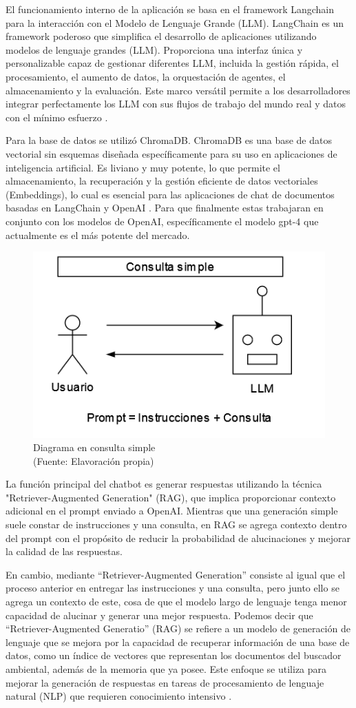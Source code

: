 El funcionamiento interno de la aplicación se basa en el framework Langchain para la interacción con el Modelo de Lenguaje Grande (LLM). 
LangChain es un framework poderoso que simplifica el desarrollo de aplicaciones utilizando modelos de lenguaje grandes (LLM). Proporciona 
una interfaz única y personalizable capaz de gestionar diferentes LLM, incluida la gestión rápida, el procesamiento, el aumento de datos, 
la orquestación de agentes, el almacenamiento y la evaluación. Este marco versátil permite a los desarrolladores integrar perfectamente 
los LLM con sus flujos de trabajo del mundo real y datos con el mínimo esfuerzo \cite{langchain1}.

Para la base de datos se utilizó ChromaDB. ChromaDB es una base de datos vectorial sin esquemas diseñada específicamente para 
su uso en aplicaciones de inteligencia artificial. Es liviano y muy potente, lo que permite el almacenamiento, la recuperación 
y la gestión eficiente de datos vectoriales (Embeddings), lo cual es esencial para las aplicaciones de chat de documentos 
basadas en LangChain y OpenAI \cite{langchain1}. Para que finalmente estas trabajaran en conjunto con los modelos de OpenAI, 
específicamente el modelo gpt-4 que actualmente es el más potente del mercado.

\begin{figure}[ht!]
    \centering
    \includegraphics[width=.4\textwidth]{figures/huemul6.png}
    \caption[Diagrama en consulta simple]{Diagrama en consulta simple\\
    {\scriptsize (Fuente: Elavoración propia)}}
    \label{fig:chatbot1}
\end{figure}


La función principal del chatbot es generar respuestas utilizando la técnica "Retriever-Augmented Generation" (RAG), 
que implica proporcionar contexto adicional en el prompt enviado a OpenAI. Mientras que una generación simple suele 
constar de instrucciones y una consulta, en RAG se agrega contexto dentro del prompt con el propósito de reducir la 
probabilidad de alucinaciones y mejorar la calidad de las respuestas. 


En cambio, mediante ``Retriever-Augmented Generation'' 
consiste al igual que el proceso anterior en entregar las instrucciones y una consulta, pero junto ello se agrega un contexto 
de este, cosa de que el modelo largo de lenguaje tenga menor capacidad de alucinar y generar una mejor respuesta. Podemos decir
que ``Retriever-Augmented Generatio'' (RAG) se refiere a un modelo de generación de lenguaje que se mejora por la capacidad 
de recuperar información de una base de datos, como un índice de vectores que representan los documentos del buscador ambiental, 
además de la memoria que ya posee. Este enfoque se utiliza para mejorar la generación de respuestas en tareas de procesamiento 
de lenguaje natural (NLP) que requieren conocimiento intensivo \cite{raq}.

